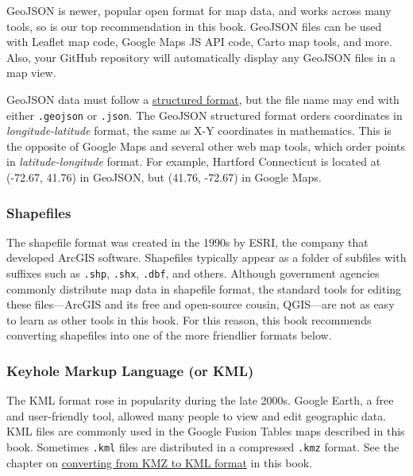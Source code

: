 \documentclass[
  english,
]{book}
\begin{document}
GeoJSON is newer, popular open format for map data, and works across many tools, so is our top recommendation in this book. GeoJSON files can be used with Leaflet map code, Google Maps JS API code, Carto map tools, and more. Also, your GitHub repository will automatically display any GeoJSON files in a map view.

GeoJSON data must follow a \href{http://geojson.org/}{structured format}, but the file name may end with either \texttt{.geojson} or \texttt{.json}. The GeoJSON structured format orders coordinates in \emph{longitude-latitude} format, the same as X-Y coordinates in mathematics. This is the opposite of Google Maps and several other web map tools, which order points in \emph{latitude-longitude} format. For example, Hartford Connecticut is located at (-72.67, 41.76) in GeoJSON, but (41.76, -72.67) in Google Maps.

\hypertarget{shapefiles}{%
\subsubsection*{Shapefiles}\label{shapefiles}}

The shapefile format was created in the 1990s by ESRI, the company that developed ArcGIS software. Shapefiles typically appear as a folder of subfiles with suffixes such as \texttt{.shp}, \texttt{.shx}, \texttt{.dbf}, and others. Although government agencies commonly distribute map data in shapefile format, the standard tools for editing these files---ArcGIS and its free and open-source cousin, QGIS---are not as easy to learn as other tools in this book. For this reason, this book recommends converting shapefiles into one of the more friendlier formats below.

\hypertarget{keyhole-markup-language-or-kml}{%
\subsubsection*{Keyhole Markup Language (or KML)}\label{keyhole-markup-language-or-kml}}

The KML format rose in popularity during the late 2000s. Google Earth, a free and user-friendly tool, allowed many people to view and edit geographic data. KML files are commonly used in the Google Fusion Tables maps described in this book. Sometimes \texttt{.kml} files are distributed in a compressed \texttt{.kmz} format. See the chapter on \href{convert-kmz}{converting from KMZ to KML format} in this book.
\end{document}
